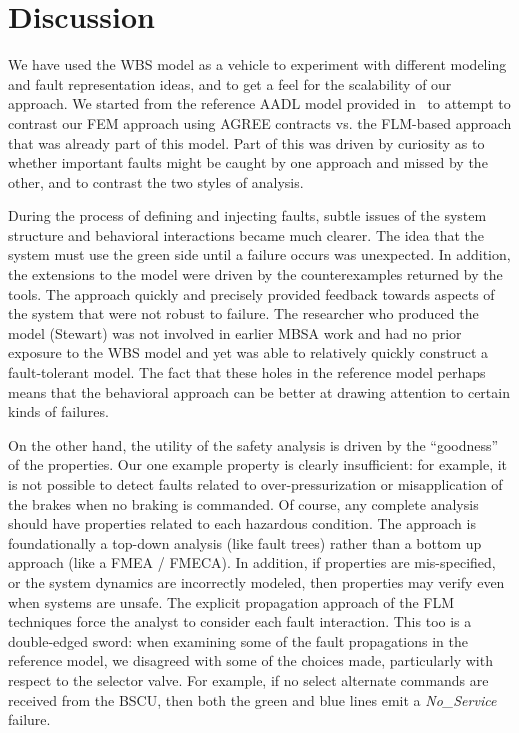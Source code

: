 \section{Discussion}
We have used the WBS model as a vehicle to experiment with different modeling and fault representation ideas, and to get a feel for the scalability of our approach.  
%
We started from the reference AADL model provided in~\cite{SEI:AADL} to attempt to contrast our FEM approach using AGREE contracts vs. the FLM-based approach that was already part of this model.  Part of this was driven by curiosity as to whether important faults might be caught by one approach and missed by the other, and to contrast the two styles of analysis.

During the process of defining and injecting faults, subtle issues of the system structure and behavioral interactions became much clearer.  The idea that the system must use the green side until a failure occurs was unexpected.  In addition, the extensions to the model were driven by the counterexamples returned by the tools.   The approach quickly and precisely provided feedback towards aspects of the system that were not robust to failure.  The researcher who produced the model (Stewart) was not involved in earlier MBSA work and had no prior exposure to the WBS model and yet was able to relatively quickly construct a fault-tolerant model.  The fact that these holes in the reference model perhaps means that the behavioral approach can be better at drawing attention to certain kinds of failures.

On the other hand, the utility of the safety analysis is driven by the ``goodness'' of the properties.  Our one example property is clearly insufficient: for example, it is not possible to detect faults related to over-pressurization or misapplication of the brakes when no braking is commanded.  Of course, any complete analysis should have properties related to each hazardous condition.  The approach is foundationally a top-down analysis (like fault trees) rather than a bottom up approach (like a FMEA / FMECA).  In addition, if properties are mis-specified, or the system dynamics are incorrectly modeled, then properties may verify even when systems are unsafe.  The explicit propagation approach of the FLM techniques force the analyst to consider each fault interaction.  This too is a double-edged sword: when examining some of the fault propagations in the reference model, we disagreed with some of the choices made, particularly with respect to the selector valve.  For example, if no select alternate commands are received from the BSCU, then both the green and blue lines emit a {\em No\_Service} failure.

